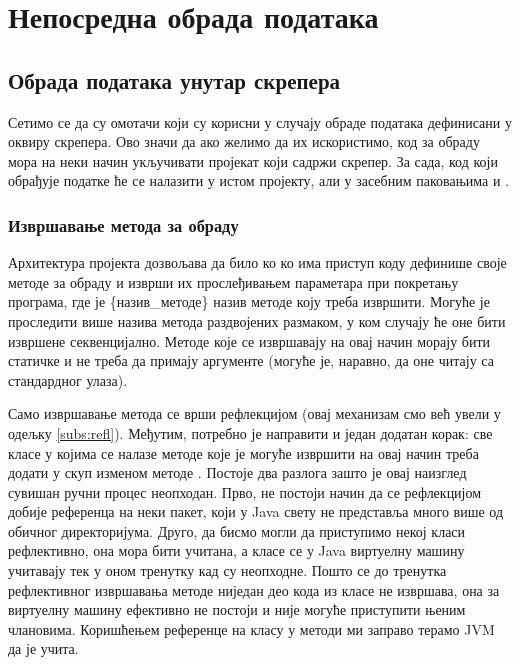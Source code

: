 \chapter{Непосредна обрада података}\label{ch:\thechapter}

\section{Обрада података унутар скрепера}

Сетимо се да су омотачи који су корисни у случају обраде података дефинисани у оквиру скрепера. Ово значи да ако желимо да их искористимо, код за обраду мора на неки начин укључивати пројекат који садржи скрепер. За сада, код који обрађује податке ће се налазити у истом пројекту, али у засебним паковањима  и .

\subsection{Извршавање метода за обраду}

Архитектура пројекта дозвољава да било ко ко има приступ коду дефинише своје методе за обраду и изврши их прослеђивањем параметара  при покретању програма, где је \{назив\_методе\} назив методе коју треба извршити. Могуће је проследити више назива метода раздвојених размаком, у ком случају ће оне бити извршене секвенцијално. Методе које се извршавају на овај начин морају бити статичке и не треба да примају аргументе (могуће је, наравно, да оне читају са стандардног улаза).

Само извршавање метода се врши рефлекцијом (овај механизам смо већ увели у одељку \ref{subs:refl}). Међутим, потребно је направити и један додатан корак: све класе у којима се налазе методе које је могуће извршити на овај начин треба додати у скуп  изменом методе . Постоје два разлога зашто је овај наизглед сувишан ручни процес неопходан. Прво, не постоји начин да се рефлекцијом добије референца на неки пакет, који у Java свету не представља много више од обичног директоријума. Друго, да бисмо могли да приступимо некој класи рефлективно, она мора бити учитана, а класе се у Java виртуелну машину учитавају тек у оном тренутку кад су неопходне. Пошто се до тренутка рефлективног извршавања методе ниједан део кода из класе не извршава, она за виртуелну машину ефективно не постоји и није могуће приступити њеним члановима. Коришћењем референце на класу у методи  ми заправо терамо JVM да је учита.

